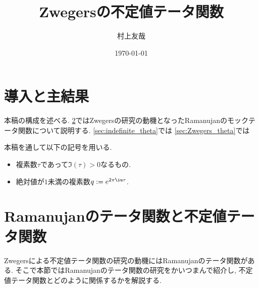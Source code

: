 \documentclass[11pt,b5paper,oneside,lualatex]{ltjsarticle} %
\numberwithin{equation}{section} %
\begin{document}

\title{Zwegersの不定値テータ関数}
\author{村上友哉}
\date{\today}

\maketitle

\tableofcontents


\section{導入と主結果} \label{sec:intro}




本稿の構成を述べる. 
\cref{sec:mock}ではZwegersの研究の動機となったRamanujanのモックテータ関数について説明する.
\cref{sec:indefinite_theta}では
\cref{sec:Zwegers_theta}では

本稿を通して以下の記号を用いる. 

\begin{symb}
	\begin{itemize}
		\item 複素数$ \tau $であって$ \Im(\tau) > 0 $なるもの.
		\item 絶対値が$ 1 $未満の複素数$ q := e^{2\pi\iu\tau} $.
	\end{itemize}
\end{symb}


\section{Ramanujanのテータ関数と不定値テータ関数} \label{sec:mock}


Zwegersによる不定値テータ関数の研究の動機にはRamanujanのテータ関数がある. 
そこで本節ではRamanujanのテータ関数の研究をかいつまんで紹介し, 不定値テータ関数とどのように関係するかを解説する. 

\end{document}
